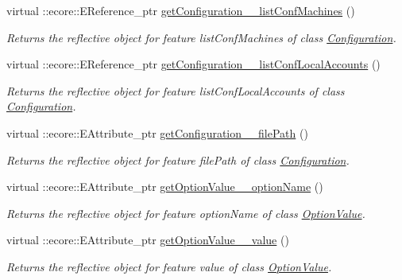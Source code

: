 \begin{DoxyCompactItemize}
virtual ::ecore::EReference\_\-ptr \hyperlink{classUMS__Data_1_1UMS__DataPackage_a83a2736f63cfb01ca136b68d4060dcd9}{getConfiguration\_\-\_\-listConfMachines} ()
\begin{DoxyCompactList}\small\item\em Returns the reflective object for feature listConfMachines of class \hyperlink{classUMS__Data_1_1Configuration}{Configuration}. \item\end{DoxyCompactList}\item 
virtual ::ecore::EReference\_\-ptr \hyperlink{classUMS__Data_1_1UMS__DataPackage_a6ceaa6250be2d926bbcd3b0e7553c3ce}{getConfiguration\_\-\_\-listConfLocalAccounts} ()
\begin{DoxyCompactList}\small\item\em Returns the reflective object for feature listConfLocalAccounts of class \hyperlink{classUMS__Data_1_1Configuration}{Configuration}. \item\end{DoxyCompactList}\item 
virtual ::ecore::EAttribute\_\-ptr \hyperlink{classUMS__Data_1_1UMS__DataPackage_a40a6912a005116f7dddd34a990be9024}{getConfiguration\_\-\_\-filePath} ()
\begin{DoxyCompactList}\small\item\em Returns the reflective object for feature filePath of class \hyperlink{classUMS__Data_1_1Configuration}{Configuration}. \item\end{DoxyCompactList}\item 
virtual ::ecore::EAttribute\_\-ptr \hyperlink{classUMS__Data_1_1UMS__DataPackage_ab584c8a5be1fa2627fa946354557a770}{getOptionValue\_\-\_\-optionName} ()
\begin{DoxyCompactList}\small\item\em Returns the reflective object for feature optionName of class \hyperlink{classUMS__Data_1_1OptionValue}{OptionValue}. \item\end{DoxyCompactList}\item 
virtual ::ecore::EAttribute\_\-ptr \hyperlink{classUMS__Data_1_1UMS__DataPackage_a62a38a2f2c86f95b7dcec1323c618639}{getOptionValue\_\-\_\-value} ()
\begin{DoxyCompactList}\small\item\em Returns the reflective object for feature value of class \hyperlink{classUMS__Data_1_1OptionValue}{OptionValue}. \item\end{DoxyCompactList}\item 

\end{DoxyCompactItemize}
